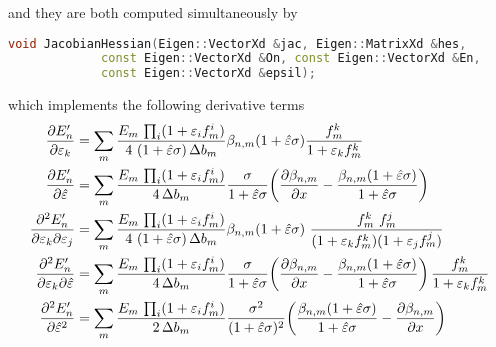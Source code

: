 \documentclass[a4paper, 11pt]{article}
\newcommand{\sk}{\hat\varepsilon}
\begin{document}
and they are both computed simultaneously by 
\begin{lstlisting}[language=C++]
    void JacobianHessian(Eigen::VectorXd &jac, Eigen::MatrixXd &hes,
			 const Eigen::VectorXd &On, const Eigen::VectorXd &En,
			 const Eigen::VectorXd &epsil);
\end{lstlisting}
which implements the following derivative terms
\begin{align}
	\pdv{E_n'}{\varepsilon_k} &= \sum_m \frac{E_m\,\textstyle\prod_i(1 + \varepsilon_i f^i_m)}%
		{4\ (1+\sk \sigma)\, \Delta b_m} \beta_{n, m}(1+\sk \sigma) \frac{f_m^k}{1+\varepsilon_k f^k_m} \\
	\pdv{E_n'}{\sk} &= \sum_m \frac{E_m\,\textstyle\prod_i(1 + \varepsilon_i f^i_m)}%
		{4\, \Delta b_m} \frac{\sigma}{1 + \sk \sigma} \qty(\pdv{\beta_{n, m}}{x} -\frac{\beta_{n,m}(1+\sk\sigma)}{1+\sk \sigma} ) \\
	\pdv{E_n'}{\varepsilon_k}{\varepsilon_j} &= \sum_m \frac{E_m\,\textstyle\prod_i(1 + \varepsilon_i f^i_m)}%
		{4\ (1+\sk \sigma)\, \Delta b_m} \beta_{n, m}(1+\sk \sigma)\ \frac{f_m^k\ f_m^j}{(1+\varepsilon_k f^k_m)(1+\varepsilon_j f^j_m)} \\
	\pdv{E_n'}{\varepsilon_k}{\sk} &= \sum_m \frac{E_m\,\textstyle\prod_i(1 + \varepsilon_i f^i_m)}%
		{4\, \Delta b_m} \frac{\sigma}{1 + \sk \sigma} \qty(\pdv{\beta_{n, m}}{x} -\frac{\beta_{n,m}(1+\sk\sigma)}{1+\sk \sigma} )
		\,\frac{f_m^k}{1+\varepsilon_k f^k_m} \\
	\pdv[2]{E_n'}{\sk} &= \sum_m \frac{E_m\,\textstyle\prod_i(1 + \varepsilon_i f^i_m)}%
		{2\, \Delta b_m} \frac{\sigma^2}{(1 + \sk \sigma)^2} \qty(\frac{\beta_{n,m}(1+\sk\sigma)}{1+\sk \sigma} - \pdv{\beta_{n, m}}{x})
\end{align}
\end{document}
